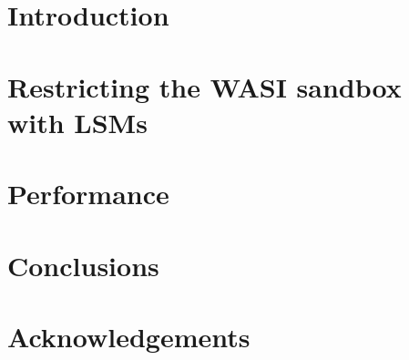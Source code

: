 \documentclass[a4paper,12pt,twoside,openright]{report}
\begin{document}
  
  \emptypage
  
  \emptypage
  \toc
  \emptypage

  \clearpage
  
  \chapter{Introduction}
  

  \chapter{Restricting the WASI sandbox with LSMs}
  \label{chap:restricting-wasi}
  

  \chapter{Performance}
  \label{chap:performance}
  

  \chapter{Conclusions}
  

  \nocite{*}
  \printbibliography[heading=bibintoc]

  \chapter*{Acknowledgements}
  
\end{document}
